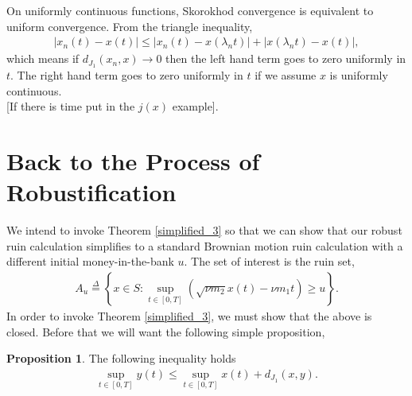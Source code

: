 \documentclass[12pt]{article}
\newcommand{\define}{\overset{\Delta}{=}}
\theoremstyle{definition}
\theoremstyle{definition}
\newtheorem{proposition}{Proposition}
\theoremstyle{definition}
\begin{document}
On uniformly continuous functions, Skorokhod convergence is equivalent to uniform convergence. From the triangle inequality, 
\begin{align*}
|x_n(t)-x(t)|\leq |x_n(t)-x(\lambda_n t)|+ |x(\lambda_n t)-x(t)|,
\end{align*}
which means if $d_{J_1}(x_n,x)\rightarrow 0$ then the left hand term goes to zero uniformly in $t$. The right hand term goes to zero uniformly in $t$ if we assume $x$ is uniformly continuous.\\

[If there is time put in the $j(x)$ example].



\clearpage
\section*{Back to the Process of Robustification}
We intend to invoke Theorem \ref{simplified_3} so that we can show that our robust ruin calculation simplifies to a standard Brownian motion ruin calculation with a different initial money-in-the-bank $u$. The set of interest is the ruin set,
\begin{align*}
A_u\define \left\{x\in S: \sup_{t\in[0,T]} \left(\sqrt{\nu m_2}x(t)-\nu m_1t\right)\geq u\right\}.
\end{align*}
In order to invoke Theorem \ref{simplified_3}, we must show that the above is closed. Before that we will want the following simple proposition,
\begin{proposition} \label{prop_inequality} The following inequality holds
\begin{align*}
\sup_{t\in[0,T]}y(t)\leq \sup_{t\in[0,T]} x(t)+d_{J_1}(x,y).
\end{align*}
\end{proposition}
\end{document}
